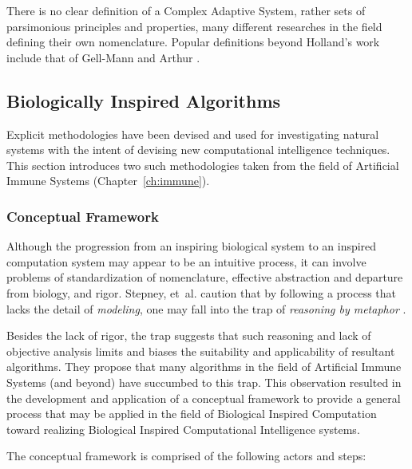 There is no clear definition of a Complex Adaptive System, rather sets of parsimonious principles and properties, many different researches in the field defining their own nomenclature. Popular definitions beyond Holland's work include that of Gell-Mann \cite{Gell-Mann1994} and Arthur \cite{Arthur1997}.



% 
% 
\subsection{Biologically Inspired Algorithms}
\label{sub:bia}
Explicit methodologies have been devised and used for investigating natural systems with the intent of devising new computational intelligence techniques. This section introduces two such methodologies taken from the field of Artificial Immune Systems (Chapter~\ref{ch:immune}).


% 
% 
\subsubsection{Conceptual Framework}
Although the progression from an inspiring biological system to an inspired computation system may appear to be an intuitive process, it can involve problems of standardization of nomenclature, effective abstraction and departure from biology, and rigor. Stepney, et~al. caution that by following a process that lacks the detail of \emph{modeling}, one may fall into the trap of \emph{reasoning by metaphor} \cite{Twycross2005, Stepney2004, Stepney2005}. 

Besides the lack of rigor, the trap suggests that such reasoning and lack of objective analysis limits and biases the suitability and applicability of resultant algorithms. They propose that many algorithms in the field of Artificial Immune Systems (and beyond) have succumbed to this trap. This observation resulted in the development and application of a conceptual framework to provide a general process that may be applied in the field of Biological Inspired Computation toward realizing Biological Inspired Computational Intelligence systems. 

The conceptual framework is comprised of the following actors and steps:

